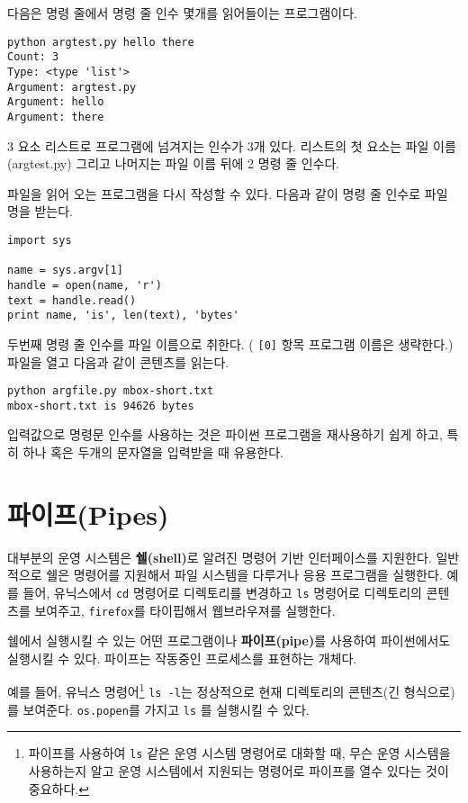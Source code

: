 다음은 명령 줄에서 명령 줄 인수 몇개를 읽어들이는 프로그램이다. 

\beforeverb
\begin{verbatim}
python argtest.py hello there
Count: 3
Type: <type 'list'>
Argument: argtest.py
Argument: hello
Argument: there
\end{verbatim}
\afterverb
%

3 요소 리스트로 프로그램에 넘겨지는 인수가 3개 있다.
리스트의 첫 요소는 파일 이름 (argtest.py) 그리고 나머지는 파일 이름 뒤에 2 명령 줄 인수다.

파일을 읽어 오는 프로그램을 다시 작성할 수 있다. 다음과 같이 명령 줄 인수로 
파일 명을 받는다. 

\beforeverb
\begin{verbatim}
import sys

name = sys.argv[1]
handle = open(name, 'r')
text = handle.read()
print name, 'is', len(text), 'bytes'
\end{verbatim}
\afterverb
%

두번째 명령 줄 인수를 파일 이름으로 취한다. ( {\tt [0]} 항목 프로그램 이름은 생략한다.)
파일을 열고 다음과 같이 콘텐츠를 읽는다.

\beforeverb
\begin{verbatim}
python argfile.py mbox-short.txt
mbox-short.txt is 94626 bytes
\end{verbatim}
\afterverb
%

입력값으로 명령문 인수를 사용하는 것은 파이썬 프로그램을 재사용하기 쉽게 하고,
특히 하나 혹은 두개의 문자열을 입력받을 때 유용한다.

\section{파이프(Pipes)}


대부분의 운영 시스템은 {\bf 쉘(shell)}로 알려진 명령어 기반 인터페이스를 지원한다.
일반적으로 쉘은 명령어를 지원해서 파일 시스템을 다루거나 응용 프로그램을 실행한다.
예를 들어, 유닉스에서 {\tt cd} 명령어로 디렉토리를 변경하고 {\tt ls} 명령어로 디렉토리의 콘텐츠를 보여주고,
{\tt firefox}를 타이핍해서 웹브라우져를 실행한다.


쉘에서 실행시킬 수 있는 어떤 프로그램이나 {\bf 파이프(pipe)}를 사용하여 파이썬에서도 실행시킬 수 있다.
파이프는 작동중인 프로세스를 표현하는 개체다.

예를 들어, 유닉스 명령어\footnote{ 파이프를 사용하여 {\tt ls} 같은 운영 시스템 명령어로 대화할 때,
무슨 운영 시스템을 사용하는지 알고 운영 시스템에서 지원되는 명령어로 파이프를 열수 있다는 것이 중요하다.}
{\tt ls -l}는 정상적으로 현재 디렉토리의 콘텐츠(긴 형식으로)를 보여준다.
{\tt os.popen}를 가지고 {\tt ls} 를 실행시킬 수 있다.

